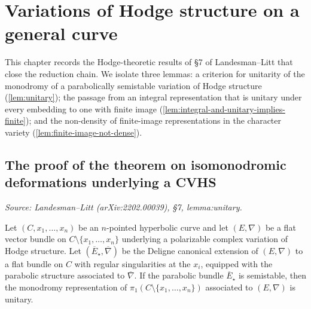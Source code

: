 \chapter{Variations of Hodge structure on a general curve}
\label{chap:hodge-results}


This chapter records the Hodge-theoretic results of \S7 of Landesman--Litt that
close the reduction chain. We isolate three lemmas: a criterion for unitarity of
the monodromy of a parabolically semistable variation of Hodge structure
(\cref{lem:unitary}); the passage from an integral representation that is unitary
under every embedding to one with finite image
(\cref{lem:integral-and-unitary-implies-finite}); and the non-density of
finite-image representations in the character variety
(\cref{lem:finite-image-not-dense}).

\section{The proof of the theorem on isomonodromic deformations underlying a CVHS}

\begin{lemma}
  \label{lem:unitary}
  \textit{Source: Landesman--Litt (arXiv:2202.00039), \S7, lemma:unitary.}

  Let $(C, x_1, \ldots, x_n)$ be an $n$-pointed hyperbolic curve and let
  $(E, \nabla)$ be a flat vector bundle on $C \setminus \{x_1, \ldots, x_n\}$
  underlying a polarizable complex variation of Hodge structure. Let
  $(\overline{E}_\star, \overline{\nabla})$ be the Deligne canonical extension of
  $(E, \nabla)$ to a flat bundle on $C$ with regular singularities at the $x_i$,
  equipped with the parabolic structure associated to $\overline{\nabla}$. If the
  parabolic bundle $\overline{E}_\star$ is semistable, then the monodromy
  representation of $\pi_1(C \setminus \{x_1, \ldots, x_n\})$ associated to
  $(E, \nabla)$ is unitary.
\end{lemma}

